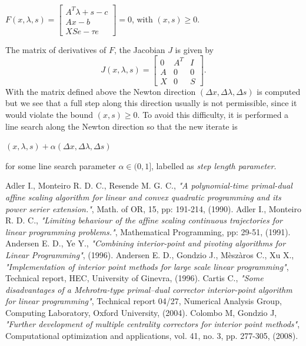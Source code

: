 \documentclass[a4paper,10 pt,titlepage,twoside]{book}
\theoremstyle{plain}
\theoremstyle{definition}
\theoremstyle{remark}
\begin{document}
{{\begin{center}
	$\mathit{F}(x,\lambda,s)= \begin{bmatrix}
	A^{T}\lambda+s-c \\Ax-b \\XSe-\tau e
	\end{bmatrix}=0$, with $(x,s)\geq0$.
\end{center}The matrix of derivatives of $F$, the Jacobian $\mathit{J}$ is given by
 \begin{equation*}
 J(x,\lambda,s)=\begin{bmatrix}
 0&A^{T}&I \\A&0&0\\X&0&S
 \end{bmatrix}.
 \end{equation*}
With the matrix defined above the Newton direction $(\Delta x, \Delta \lambda, \Delta s)$ is computed but we see that a full step along this direction usually is not permissible, since it would violate the bound $(x,s)\geq 0 $. To avoid this difficulty, it is performed a line search along the Newton direction so that the new iterate is
\begin{center}
	$(x,\lambda,s)+\alpha (\Delta x, \Delta \lambda, \Delta s)$
\end{center}
for some line search parameter $\alpha\in(0,1]$, labelled as \textit{step length parameter}.

\begin{thebibliography}{9}
	
	 Adler I., Monteiro R. D. C., Resende M. G. C., \emph{"A polynomial-time primal-dual affine scaling algorithm for linear and convex quadratic programming and its power serier extension."}, Math. of OR, 15, pp: 191-214, (1990).
	 Adler I., Monteiro R. D. C., \emph{"Limiting behaviour of the affine scaling continuous trajectories for linear programming problems."}, Mathematical Programming, pp: 29-51, (1991).
	 Andersen E. D., Ye Y.,  \emph{"Combining interior-point and pivoting algorithms for Linear Programming"}, (1996).
	 Andersen E. D., Gondzio J., Mèszàros C., Xu X., \textit{"Implementation of interior point methods for large scale linear programming"}, Technical report, HEC,
    University of Ginevra, (1996).
	Cartis C., \emph{"Some disadvantages of a Mehrotra-type primal–dual corrector interior-point algorithm
	for linear programming"}, Technical report 04/27, Numerical Analysis Group, Computing Laboratory,
	Oxford University, (2004).
	Colombo M, Gondzio J, \emph{"Further development of multiple centrality correctors for interior point
	methods"}, Computational optimization and applications, vol. 41, no. 3, pp. 277-305, (2008).


\end{thebibliography}}}
\end{document}
